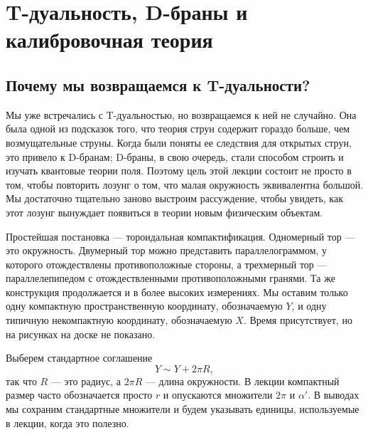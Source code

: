 \chapter{T-дуальность, D-браны и калибровочная теория}


\section{Почему мы возвращаемся к T-дуальности?}

Мы уже встречались с T-дуальностью, но возвращаемся к ней не случайно. Она была одной из подсказок того, что теория струн содержит гораздо больше, чем возмущательные струны. Когда были поняты ее следствия для открытых струн, это привело к D-бранам; D-браны, в свою очередь, стали способом строить и изучать квантовые теории поля. Поэтому цель этой лекции состоит не просто в том, чтобы повторить лозунг о том, что малая окружность эквивалентна большой. Мы достаточно тщательно заново выстроим рассуждение, чтобы увидеть, как этот лозунг вынуждает появиться в теории новым физическим объектам.

Простейшая постановка — тороидальная компактификация. Одномерный тор — это окружность. Двумерный тор можно представить параллелограммом, у которого отождествлены противоположные стороны, а трехмерный тор — параллелепипедом с отождествленными противоположными гранями. Та же конструкция продолжается и в более высоких измерениях. Мы оставим только одну компактную пространственную координату, обозначаемую \(Y\), и одну типичную некомпактную координату, обозначаемую \(X\). Время присутствует, но на рисунках на доске не показано.

Выберем стандартное соглашение
\begin{equation}
  Y\sim Y+2\pi R,
  \label{eq:l10-circle-identification}
\end{equation}
так что \(R\) — это радиус, а \(2\pi R\) — длина окружности. В лекции компактный размер часто обозначается просто \(r\) и опускаются множители \(2\pi\) и \(\alpha'\). В выводах мы сохраним стандартные множители и будем указывать единицы, используемые в лекции, когда это полезно.

